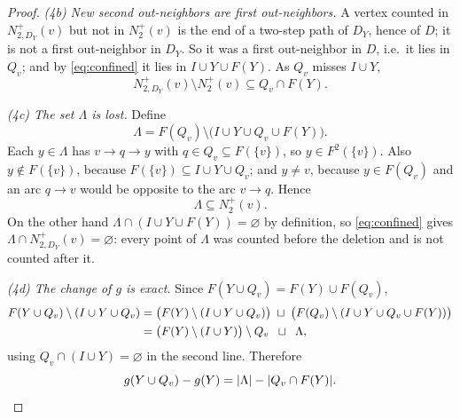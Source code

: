 \begin{proof}
\emph{(4b) New second out-neighbors are first out-neighbors.} A vertex counted in
$N_{2,D_Y}^+(v)$ but not in $N_2^+(v)$ is the end of a two-step path of $D_Y$, hence of $D$; it is
not a first out-neighbor in $D_Y$. So it was a first out-neighbor in $D$, i.e.\ it lies in $Q_v$;
and by \eqref{eq:confined} it lies in $I\cup Y\cup F(Y)$. As $Q_v$ misses $I\cup Y$,
\begin{equation}\label{eq:new}
 N_{2,D_Y}^+(v)\setminus N_2^+(v)\subseteq Q_v\cap F(Y).
\end{equation}

\emph{(4c) The set $\Lambda$ is lost.} Define
\begin{equation}\label{eq:Lambda}
 \Lambda=F(Q_v)\setminus\bigl(I\cup Y\cup Q_v\cup F(Y)\bigr).
\end{equation}
Each $y\in\Lambda$ has $v\to q\to y$ with $q\in Q_v\subseteq F(\{v\})$, so $y\in F^2(\{v\})$. Also
$y\notin F(\{v\})$, because $F(\{v\})\subseteq I\cup Y\cup Q_v$; and $y\ne v$, because $y\in F(Q_v)$
and an arc $q\to v$ would be opposite to the arc $v\to q$. Hence
\begin{equation}\label{eq:Lambda-sub}
 \Lambda\subseteq N_2^+(v).
\end{equation}
On the other hand $\Lambda\cap(I\cup Y\cup F(Y))=\varnothing$ by definition, so \eqref{eq:confined}
gives $\Lambda\cap N_{2,D_Y}^+(v)=\varnothing$: every point of $\Lambda$ was counted before the
deletion and is not counted after it.

\emph{(4d) The change of $g$ is exact.} Since $F(Y\cup Q_v)=F(Y)\cup F(Q_v)$,
\begin{align}
 F(Y\cup Q_v)\setminus(I\cup Y\cup Q_v)
 &=\bigl(F(Y)\setminus(I\cup Y\cup Q_v)\bigr)
   \;\sqcup\;\bigl(F(Q_v)\setminus(I\cup Y\cup Q_v\cup F(Y))\bigr)\notag\\
 &=\bigl(F(Y)\setminus(I\cup Y)\bigr)\setminus Q_v\;\;\sqcup\;\;\Lambda,
 \label{eq:g-change}
\end{align}
using $Q_v\cap(I\cup Y)=\varnothing$ in the second line. Therefore
\begin{equation}\label{eq:g-diff}
 g(Y\cup Q_v)-g(Y)=\lvert \Lambda\rvert-\lvert Q_v\cap F(Y)\rvert.
\end{equation}


\end{proof}
